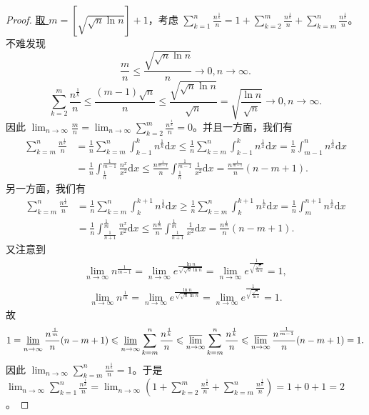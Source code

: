 \documentclass[../../main.tex]{subfiles}
\begin{document}
\begin{proof}
\hyperlink{取m的原因}{取 \(m = [\sqrt{\sqrt{n}\ln n}]+1\)}，考虑 \(\sum_{k = 1}^n\frac{n^{\frac{1}{k}}}{n}=1+\sum_{k = 2}^m\frac{n^{\frac{1}{k}}}{n}+\sum_{k = m}^n\frac{n^{\frac{1}{k}}}{n}\)。不难发现
\[
\frac{m}{n}\leqslant \frac{\sqrt{\sqrt{n}\ln n}}{n}\rightarrow 0,n\rightarrow \infty.
\]
\[
\sum_{k = 2}^m\frac{n^{\frac{1}{k}}}{n}\leqslant \frac{(m - 1)\sqrt{n}}{n}\leqslant \frac{\sqrt{\sqrt{n}\ln n}}{\sqrt{n}}=\sqrt{\frac{\ln n}{\sqrt{n}}}\rightarrow 0,n\rightarrow \infty.
\]
因此 \(\lim_{n\rightarrow \infty}\frac{m}{n}=\lim_{n\rightarrow \infty}\sum_{k = 2}^m\frac{n^{\frac{1}{k}}}{n}=0\)。并且一方面，我们有
\begin{align*}
\sum_{k=m}^n{\frac{n^{\frac{1}{k}}}{n}}&=\frac{1}{n}\sum_{k=m}^n{\int_{k-1}^k{n^{\frac{1}{k}}\mathrm{d}x}}\leqslant \frac{1}{n}\sum_{k=m}^n{\int_{k-1}^k{n^{\frac{1}{x}}\mathrm{d}x}}=\frac{1}{n}\int_{m-1}^n{n^{\frac{1}{x}}\mathrm{d}x}
\\
&=\frac{1}{n}\int_{\frac{1}{n}}^{\frac{1}{m-1}}{\frac{n^x}{x^2}\mathrm{d}x}\leqslant \frac{n^{\frac{1}{m-1}}}{n}\int_{\frac{1}{n}}^{\frac{1}{m-1}}{\frac{1}{x^2}\mathrm{d}x}=\frac{n^{\frac{1}{m-1}}}{n}\left( n-m+1 \right) .
\end{align*}
另一方面，我们有
\begin{align*}
\sum_{k=m}^n{\frac{n^{\frac{1}{k}}}{n}}&=\frac{1}{n}\sum_{k=m}^n{\int_k^{k+1}{n^{\frac{1}{k}}\mathrm{d}x}}\geqslant \frac{1}{n}\sum_{k=m}^n{\int_k^{k+1}{n^{\frac{1}{x}}\mathrm{d}x}}=\frac{1}{n}\int_m^{n+1}{n^{\frac{1}{x}}\mathrm{d}x}
\\
&=\frac{1}{n}\int_{\frac{1}{n+1}}^{\frac{1}{m}}{\frac{n^x}{x^2}\mathrm{d}x}\leqslant \frac{n^{\frac{1}{m}}}{n}\int_{\frac{1}{n+1}}^{\frac{1}{m}}{\frac{1}{x^2}\mathrm{d}x}=\frac{n^{\frac{1}{m}}}{n}\left( n-m+1 \right) .
\end{align*}
又注意到
\begin{align*}
\lim_{n\rightarrow \infty}n^{\frac{1}{m - 1}}=\lim_{n\rightarrow \infty}e^{\frac{\ln n}{\sqrt{\sqrt{n}\ln n}}}
=\lim_{n\rightarrow \infty}e^{\frac{1}{\sqrt{\frac{\sqrt{n}}{\ln n}}}}
=1,
\end{align*}
\begin{align*}
\lim_{n\rightarrow \infty}n^{\frac{1}{m}}=\lim_{n\rightarrow \infty}e^{\frac{\ln n}{\sqrt{\sqrt{n}\ln n}}}
=\lim_{n\rightarrow \infty}e^{\frac{1}{\sqrt{\frac{\sqrt{n}}{\ln n}}}}
=1.
\end{align*}
故
\[
1=\varliminf_{n\rightarrow \infty}\frac{n^{\frac{1}{m}}}{n}(n - m + 1)\leqslant \varliminf_{n\rightarrow \infty}\sum_{k = m}^n\frac{n^{\frac{1}{k}}}{n}\leqslant \varlimsup_{n\rightarrow \infty}\sum_{k = m}^n\frac{n^{\frac{1}{k}}}{n}\leqslant \varlimsup_{n\rightarrow \infty}\frac{n^{\frac{1}{m - 1}}}{n}(n - m + 1)=1.
\]
因此 \(\lim_{n\rightarrow \infty}\sum_{k = m}^n\frac{n^{\frac{1}{k}}}{n}=1\)。于是 \(\lim_{n\rightarrow \infty}\sum_{k = 1}^n\frac{n^{\frac{1}{k}}}{n}=\lim_{n\rightarrow \infty}\left(1+\sum_{k = 2}^m\frac{n^{\frac{1}{k}}}{n}+\sum_{k = m}^n\frac{n^{\frac{1}{k}}}{n}\right)=1 + 0+1 = 2\)。
\end{proof}
\end{document}
